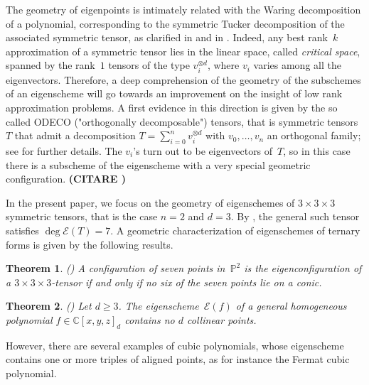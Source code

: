 \documentclass{amsart}
\theoremstyle{plain}
\newtheorem{theoremintro}{Theorem}
\theoremstyle{definition}
\newcommand{\C}{\mathbb{C}}
\newcommand{\p}{\mathbb{P}}
\newcommand{\Eig}[1]{\mathcal{E}\!\left( {#1} \right)}
\begin{document}
The geometry of eigenpoints is intimately related with the Waring decomposition of a polynomial,
corresponding to the symmetric Tucker decomposition of the associated symmetric tensor,
as clarified
in \cite{DOT} and in \cite{Ott}. Indeed, any best rank~$k$ approximation of a symmetric tensor lies in the linear
space, called \emph{critical space}, spanned by the rank~$1$ tensors of the type $v_i ^{\otimes d}$, where $v_i$ varies among all the eigenvectors. Therefore, a deep comprehension of the geometry of the subschemes of an eigenscheme will
go towards an improvement on the insight of low rank approximation problems. A first evidence in this direction is given by the so called ODECO ("orthogonally decomposable") tensors, that is symmetric tensors~$T$ that admit a decomposition
$T = \sum _{i=0}^n v_i ^{\otimes d}$ with $v_0, \dotsc, v_n$ an orthogonal family; see \cite{Rob, BDHE}
for further details. The $v_i$'s turn out to be eigenvectors of~$T$, so in this case there is a subscheme of the eigenscheme with a very special geometric configuration.
\textbf{(CITARE \cite{Ottaviani24})}

 In the present paper, we focus on the geometry of eigenschemes of $3\times 3 \times 3$ symmetric tensors, that is the case $n=2$ and $d=3$. By , the general such tensor
 satisfies $\deg \Eig{T}=7$. A geometric characterization of eigenschemes of ternary forms is given by the following results.

\begin{theoremintro}(\cite[Theorem 5.1]{ASS})
A configuration of seven points in~$\p^2$ is the eigenconfiguration
of a $3 \times 3 \times 3$-tensor if and only if no six of the seven points lie on a conic.
\end{theoremintro}

\begin{theoremintro}(\cite[Theorem 5.7]{BGV})
\label{thm:general_no_d_collinear}
Let $d \ge 3$. The eigenscheme~$\Eig{f}$ of a general homogeneous polynomial $f \in \C[x, y, z]_d$ contains no $d$ collinear points.
\end{theoremintro}

However, there are several examples of cubic polynomials, whose eigenscheme contains one or more triples of aligned points, as for instance the Fermat cubic polynomial.
\end{document}
